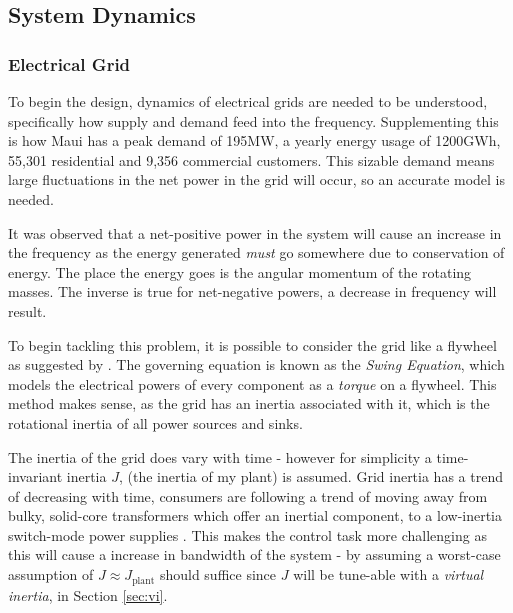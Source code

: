 \subsection{System Dynamics}
\label{sec:sysdyn}
\subsubsection{Electrical Grid}

To begin the design, dynamics of electrical grids are needed to be understood, specifically how supply and demand feed into the frequency.
Supplementing this is how Maui has a {peak demand of 195MW, a yearly energy usage of 1200GWh}, 55,301 residential and 9,356 commercial customers.
This sizable demand means large fluctuations in the net power in the grid will occur, so an accurate model is needed.

It was observed that a net-positive power in the system will cause an increase in the frequency as the energy generated \emph{must} go somewhere due to conservation of energy.
The place the energy goes is the angular momentum of the rotating masses.
The inverse is true for net-negative powers, a decrease in frequency will result.

To begin tackling this problem, it is possible to consider the grid like a flywheel as suggested by \cite{power:swing}.
The governing equation is known as the \emph{Swing Equation}, which models the electrical powers of every component as a \emph{torque} on a flywheel.
This method makes sense, as the grid has an inertia associated with it, which is the rotational inertia of all power sources and sinks.

The inertia of the grid does vary with time - however for simplicity a time-invariant inertia $J$, (the inertia of my plant) is assumed.
Grid inertia has a trend of decreasing with time, consumers are following a trend of moving away from bulky, solid-core transformers which offer an inertial component, to a low-inertia switch-mode power supplies \cite{power:vi}.
This makes the control task more challenging as this will cause a increase in bandwidth of the system - by assuming a worst-case assumption of $J \approx J_{\text{plant}}$ should suffice since $J$ will be tune-able with a \emph{virtual inertia}, in Section \ref{sec:vi}.

